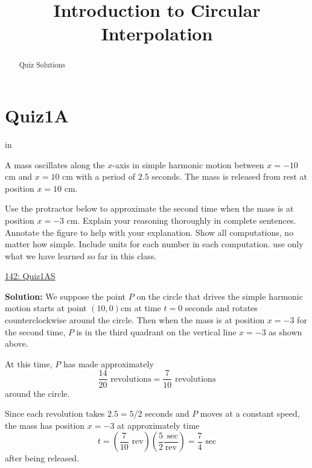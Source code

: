 \documentclass{ximera}
\title{Introduction to Circular Interpolation}
\newcommand{\pskip}{\vskip 0.1 in}
\begin{document}
\begin{abstract}
Quiz Solutions
\end{abstract}
\maketitle

\section{Quiz1A}

\pskip



A mass oscillates along the $x$-axis in simple harmonic motion between $x=-10$ cm and $x=10$ cm with a period of $2.5$ seconds. The mass is released from rest at position $x=10$ cm.

Use the protractor below to approximate the second time when the mass is at position $x=-3$ cm. Explain your reasoning thoroughly in complete sentences. Annotate the figure to help with your explanation. Show all computations, no matter how simple. Include units for each number in each computation. use only what we have learned so far in this class.

\begin{onlineOnly}
    \begin{center}
\end{center}
\end{onlineOnly}

\href{https://www.desmos.com/calculator/5fuh8n6ef1}{142: Quiz1AS}


{\bf Solution:} We suppose the point $P$ on the circle that drives the simple harmonic motion starts at point $(10,0)$cm at time $t=0$ seconds and rotates counterclockwise around the circle. Then when the mass is at position $x=-3$ for the second time, $P$ is in the third quadrant on the vertical line $x=-3$ as shown above.

At this time, $P$ has made approximately
\[
     \frac{14}{20}\text{ revolutions} = \frac{7}{10} \text{ revolutions}
\]
around the circle. 

Since each revolution takes $2.5 = 5/2$ seconds and $P$ moves at a constant speed, the mass has position $x=-3$ at approximately time
\[
 t = \left( \frac{7}{10} \text{ rev}  \right) \left(\frac{5}{2} \frac{\text{ sec}}{\text{rev}}  \right) = \frac{7}{4} \text{ sec}
\]
after being released.
\end{document}
